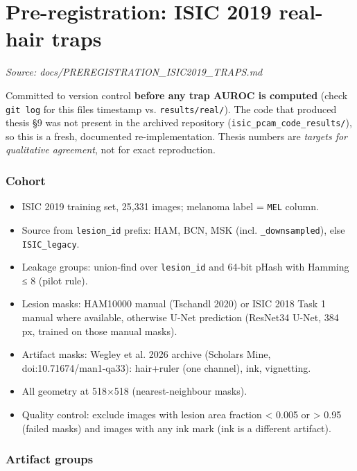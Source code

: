 \section{Pre-registration: ISIC 2019 real-hair traps}\label{doc:PREREGISTRATION_ISIC2019_TRAPS}
\noindent\textit{Source: docs/PREREGISTRATION\_ISIC2019\_TRAPS.md}

{\small
Committed to version control \textbf{before any trap AUROC is computed} (check \texttt{git\ log} for this file\textquotesingle s
timestamp vs. \texttt{results/real/}). The code that produced thesis §9 was not present in the archived
repository (\texttt{isic\_pcam\_code\_results/}), so this is a fresh, documented re-implementation. Thesis
numbers are \emph{targets for qualitative agreement}, not for exact reproduction.

\subsubsection{Cohort}\label{cohort}

\begin{itemize}

\item
  ISIC 2019 training set, 25,331 images; melanoma label = \texttt{MEL} column.
\item
  Source from \texttt{lesion\_id} prefix: HAM, BCN, MSK (incl. \texttt{\_downsampled}), else \texttt{ISIC\_legacy}.
\item
  Leakage groups: union-find over \texttt{lesion\_id} and 64-bit pHash with Hamming ≤ 8 (pilot rule).
\item
  Lesion masks: HAM10000 manual (Tschandl 2020) or ISIC 2018 Task 1 manual where available,
  otherwise U-Net prediction (ResNet34 U-Net, 384 px, trained on those manual masks).
\item
  Artifact masks: Wegley et al. 2026 archive (Scholars\textquotesingle{} Mine, doi:10.71674/man1-qa33):
  hair+ruler (one channel), ink, vignetting.
\item
  All geometry at 518×518 (nearest-neighbour masks).
\item
  Quality control: exclude images with lesion area fraction \textless{} 0.005 or \textgreater{} 0.95 (failed masks) and
  images with any ink mark (ink is a different artifact).
\end{itemize}

\subsubsection{Artifact groups}\label{artifact-groups}

}
